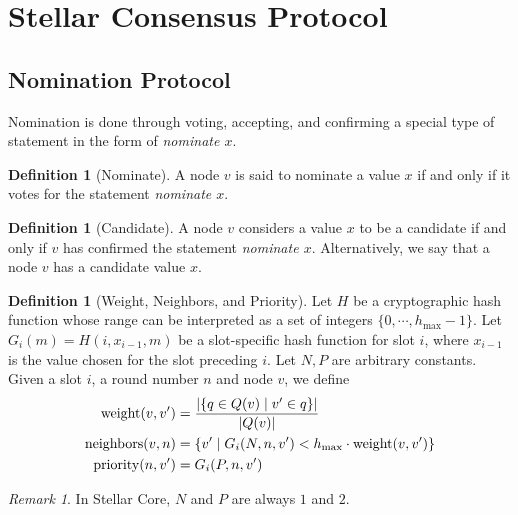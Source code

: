 \documentclass[12pt, psamsfonts]{amsart}
\theoremstyle{definition}
\newtheorem{defn}[thm]{Definition}
\theoremstyle{remark}
\newtheorem{rem}[thm]{Remark}
\DeclareMathOperator{\weight}{weight}
\DeclareMathOperator{\neighbors}{neighbors}
\DeclareMathOperator{\priority}{priority}
\numberwithin{equation}{subsection}
\begin{document}
\newpage
\section{Stellar Consensus Protocol}
\subsection{Nomination Protocol}

Nomination is done through voting, accepting, and confirming a special type of statement in the form of \textit{nominate $x$}.

\begin{defn}[Nominate]
    A node $v$ is said to nominate a value $x$ if and only if it votes for the statement \textit{nominate $x$}.
\end{defn}

\begin{defn}[Candidate]
    A node $v$ considers a value $x$ to be a candidate if and only if $v$ has confirmed the statement \textit{nominate $x$}.
    Alternatively, we say that a node $v$ has a candidate value $x$.
\end{defn}

\begin{defn}[Weight, Neighbors, and Priority]
    Let $H$ be a cryptographic hash function whose range can be interpreted as a set of integers $\{ 0, \cdots, h_{\max} - 1 \}$.
    Let $G_i(m) = H(i, x_{i - 1}, m)$ be a slot-specific hash function for slot $i$, where $x_{i - 1}$ is the value chosen for the slot preceding $i$.
    Let $N, P$ are arbitrary constants.
    Given a slot $i$, a round number $n$ and node $v$, we define
    \begin{align*}
        \weight(v, v') &= \frac{\abs{\{ q \in Q(v) \mid v' \in q \}}}{\abs{Q(v)}} \\
        \neighbors(v, n) &= \{ v' \mid G_i(N, n, v') < h_{\max} \cdot \weight(v, v') \} \\
        \priority(n, v') &= G_i(P, n, v')
    \end{align*}
\end{defn}

\begin{rem}
    In Stellar Core, $N$ and $P$ are always $1$ and $2$.
\end{rem}
\end{document}
